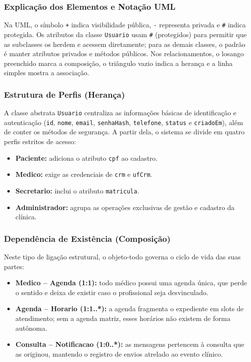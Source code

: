 \documentclass[12pt,a4paper]{article}
\providecommand{\tightlist}{%
  \setlength{\itemsep}{0pt}\setlength{\parskip}{0pt}}
\begin{document}
\newpage
\subsubsection*{Explicação dos Elementos e Notação UML}

Na UML, o símbolo \texttt{+} indica visibilidade pública, \texttt{-}
representa privada e \texttt{\#} indica protegida. Os atributos da
classe \texttt{Usuario} usam \texttt{\#} (protegidos) para permitir que
as subclasses os herdem e acessem diretamente; para as demais classes, o
padrão é manter atributos privados e métodos públicos. Nos
relacionamentos, o losango preenchido marca a composição, o triângulo
vazio indica a herança e a linha simples mostra a associação.

\subsubsection*{Estrutura de Perfis (Herança)}

A classe abstrata \texttt{Usuario} centraliza as informações básicas de
identificação e autenticação (\texttt{id}, \texttt{nome}, \texttt{email},
\texttt{senhaHash}, \texttt{telefone}, \texttt{status} e
\texttt{criadoEm}), além de conter os métodos de segurança. A partir
dela, o sistema se divide em quatro perfis estritos de acesso:

\begin{itemize}
\tightlist
\item
  \textbf{Paciente:} adiciona o atributo \texttt{cpf} ao cadastro.
\item
  \textbf{Medico:} exige as credenciais de \texttt{crm} e \texttt{ufCrm}.
\item
  \textbf{Secretario:} inclui o atributo \texttt{matricula}.
\item
  \textbf{Administrador:} agrupa as operações exclusivas de gestão e
  cadastro da clínica.
\end{itemize}

\subsubsection*{Dependência de Existência (Composição)}

Neste tipo de ligação estrutural, o objeto-todo governa o ciclo de vida
das suas partes:

\begin{itemize}
\tightlist
\item
  \textbf{Medico -- Agenda (1:1):} todo médico possui uma agenda única,
  que perde o sentido e deixa de existir caso o profissional seja
  desvinculado.
\item
  \textbf{Agenda -- Horario (1:1..*):} a agenda fragmenta o expediente em
  slots de atendimento; sem a agenda matriz, esses horários não existem
  de forma autônoma.
\item
  \textbf{Consulta -- Notificacao (1:0..*):} as mensagens pertencem à
  consulta que as originou, mantendo o registro de envios atrelado ao
  evento clínico.
\end{itemize}
\end{document}
